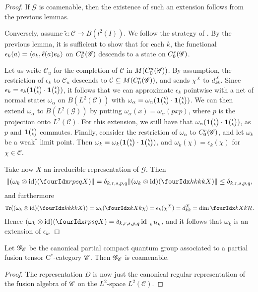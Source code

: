 \begin{proof} If $\mathscr{G}$ is coamenable, then the existence of such an extension follows from the previous lemmas. 

Conversely, assume $\tilde{\epsilon}:\mathcal{C}\rightarrow B(l^2(I))$. We follow the strategy of \cite[Theorem 2.7.10]{NeT1}. By the previous lemma, it is sufficient to show that for each $k$, the functional $\epsilon_k(a) = \langle e_k,\operatorname{\tilde{\epsilon}}(a)e_k\rangle$ on $C^{u}_{0}(\mathscr{G})$ descends to a state on $C^{r}_{0}(\mathscr{G})$.

Let us write $\mathcal{C}_u$ for the completion of $\mathscr{C}$ in $M(C^{u}_{0}(\mathscr{G}))$. By assumption, the restriction of $\epsilon_k$ to $\mathcal{C}_u$ descends to $\mathcal{C}\subseteq M(C^{r}_{0}(\mathscr{G}))$, and sends $\chi^X$ to $d_{kk}^X$. Since $\epsilon_k = \epsilon_k(\mathbf{1}{\tiny {\begin{pmatrix} k\\k\end{pmatrix}}}\cdot \mathbf{1}{\tiny {\begin{pmatrix} k\\k\end{pmatrix}}})$, it follows that we can approximate $\epsilon_k$ pointwise with a net of normal states $\omega_{\alpha}$ on $B(L^2(\mathcal{C}))$ with $\omega_{\alpha} = \omega_{\alpha}(\mathbf{1}{\tiny {\begin{pmatrix} k\\k\end{pmatrix}}}\cdot \mathbf{1}{\tiny {\begin{pmatrix} k\\k\end{pmatrix}}})$. We can then extend $\omega_{\alpha}$ to $B(L^2(\mathscr{G}))$ by putting $\omega_{\alpha}(x) = \omega_{\alpha}(pxp)$, where $p$ is the projection onto $L^2(\mathcal{C})$. For this extension, we still have that $\omega_{\alpha}(\mathbf{1}{\tiny {\begin{pmatrix} k\\k\end{pmatrix}}}\cdot \mathbf{1}{\tiny {\begin{pmatrix} k\\k\end{pmatrix}}})$, as $p$ and $\mathbf{1}{\tiny {\begin{pmatrix} k\\k\end{pmatrix}}}$ commutes. Finally, consider the restriction of $\omega_{\alpha}$ to $C^{r}_{0}(\mathscr{G})$, and let $\omega_k$ be a weak$^*$ limit point. Then $\omega_k = \omega_k(\mathbf{1}{\tiny {\begin{pmatrix} k\\k\end{pmatrix}}}\cdot \mathbf{1}{\tiny {\begin{pmatrix} k\\k\end{pmatrix}}})$, and $\omega_k(\chi) = \epsilon_k(\chi)$ for $\chi \in \mathcal{C}$. 

Take now $X$ an irreducible representation of $\mathscr{G}$. Then \begin{align*}\|(\omega_k\otimes \id)(\Gr{X}{r}{s}{p}{q})\| = \delta_{k,r,s,p,q} \|(\omega_k\otimes \id)(\Gr{X}{k}{k}{k}{k})\| \leq \delta_{k,r,s,p,q},\end{align*} and furthermore \begin{align*}\Tr( (\omega_k\otimes \id)(\Gr{X}{k}{k}{k}{k})) = \omega_k(\Gr{\chi}{}{X}{k}{k}) = \epsilon_k(\chi^X) =d^X_{kk} = \dim \Gr{\Hsp}{}{X}{k}{k}.\end{align*} Hence $ (\omega_k\otimes \id)(\Gr{X}{r}{s}{p}{q}) = \delta_{k,r,s,p,q} \id_{\GrDA{\Hsp}{k}{k}}$, and it follows that $\omega_k$ is an extension of $\epsilon_k$. 
\end{proof}  
 
 \begin{Cor} Let $\mathscr{G}_{\mathscr{C}}$ be the canonical partial compact quantum group associated to a partial fusion tensor C$^*$-category $\mathscr{C}$. Then $\mathscr{G}_{\mathscr{C}}$ is coamenable.  
 \end{Cor}
 \begin{proof} The representation $D$ is now just the canonical regular representation of the fusion algebra of $\mathscr{C}$ on the $L^2$-space $L^2(\mathcal{C})$. 
 \end{proof}
 

